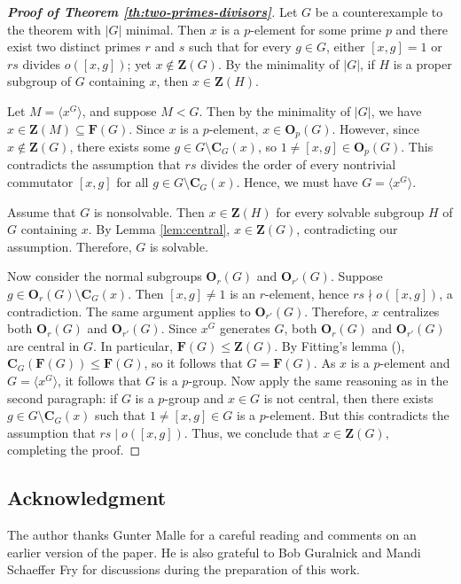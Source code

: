 \documentclass[twoside,a4paper,reqno,12pt]{amsart}
\newcommand{\<}{\langle}
\renewcommand{\>}{\rangle}
\newcommand{\la}{\langle}
\newcommand{\ra}{\rangle}
\newcommand{\leqs}{\leqslant}
\newcommand{\OB}{\mathbf{O}}
\newcommand{\CB}{\mathbf{C}}
\newcommand{\FB}{\mathbf{F}}
\newcommand{\ZB}{\mathbf{Z}}
\renewcommand{\leq}{\leqs}
\renewcommand{\:}{\colon}
\theoremstyle{definition}
\begin{document}
\begin{proof}[\textbf{Proof of Theorem \ref{th:two-primes-divisors}}]

Let $G$ be a counterexample to the theorem with $|G|$ minimal. Then $x$ is a $p$-element for some prime $p$ and there exist two distinct primes $r$ and $s$ such that  for every $g\in G$, either $[x,g]=1$ or $rs$ divides $o([x,g])$; yet $x\not\in \ZB(G)$. 
By the minimality of $|G|$, if $H$ is a proper subgroup of $G$ containing $x$, then $x\in \ZB(H)$.

Let $M=\la x^G\ra$, and suppose $M<G.$ Then by the minimality of $|G|$,  we have $x\in \ZB(M)\subseteq \FB(G)$. Since $x$ is a $p$-element, $x\in \OB_p(G)$. However, since $x\not\in \ZB(G)$, there exists  some $g\in G\setminus \CB_G(x)$, so  $1\neq [x,g]\in \OB_p(G)$. This contradicts the assumption that  $rs$ divides the order of every nontrivial commutator $ [x,g]$ for all $g\in G\setminus \CB_G(x)$. Hence, we must have $G=\la x^G\ra.$
 
 Assume that $G$ is nonsolvable. Then $x\in \ZB(H)$ for every solvable subgroup  $H$ of $G$ containing $x$. By Lemma \ref{lem:central}, $x\in \ZB(G)$, contradicting our assumption. Therefore, $G$ is solvable.


Now consider the normal subgroups $\OB_r(G)$ and $\OB_{r'}(G)$. Suppose $g\in \OB_r(G)\setminus \CB_{G}(x)$. Then $[x,g]\neq 1$ is an $r$-element, hence $rs\nmid o([x,g])$, a contradiction. The same argument applies to $\OB_{r'}(G)$. Therefore,  $x$ centralizes both $\OB_r(G)$ and $\OB_{r'}(G)$. Since $x^G$ generates $G$, both $\OB_r(G)$ and $\OB_{r'}(G)$ are central in $G$. In particular, $\FB(G)\leq \ZB(G)$. By Fitting's lemma (\cite[31.10]{Aschbacher}), $\CB_G(\FB(G))\leq  \FB(G)$, so it follows that $G=\FB(G)$. As $x$ is a $p$-element and $G=\la x^G\ra$, it follows that $G$ is a $p$-group. Now apply the same reasoning as in the second paragraph: if $G$ is a $p$-group and $x\in G$ is not central, then there exists $g\in G\setminus \CB_G(x)$ such that $1\neq [x,g]\in G$ is a $p$-element. But this contradicts the assumption that $rs\mid o([x,g])$. Thus, we conclude that $x\in \ZB(G),$ completing  the proof.
\end{proof}



\subsection*{Acknowledgment} The author thanks Gunter Malle for a careful reading and comments on an earlier version of the paper. He is also grateful to Bob Guralnick and Mandi Schaeffer Fry for discussions during the preparation of this work.
\end{document}
